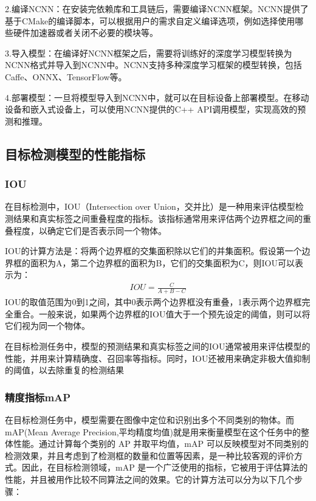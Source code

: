 \documentclass{ctexart}
\numberwithin{equation}{section}%
\numberwithin{figure}{section}%
\numberwithin{table}{section}%
\begin{document}
	2.编译NCNN：在安装完依赖库和工具链后，需要编译NCNN框架。NCNN提供了基于CMake的编译脚本，可以根据用户的需求自定义编译选项，例如选择使用哪些硬件加速器或者关闭不必要的模块等。
	
	3.导入模型：在编译好NCNN框架之后，需要将训练好的深度学习模型转换为NCNN格式并导入到NCNN中。NCNN支持多种深度学习框架的模型转换，包括Caffe、ONNX、TensorFlow等。
	
	4.部署模型：一旦将模型导入到NCNN中，就可以在目标设备上部署模型。在移动设备和嵌入式设备上，可以使用NCNN提供的C++ API调用模型，实现高效的预测和推理。
	
	\subsection{目标检测模型的性能指标}
	\subsubsection{IOU}
	在目标检测中，IOU（Intersection over Union，交并比）是一种用来评估模型检测结果和真实标签之间重叠程度的指标。该指标通常用来评估两个边界框之间的重叠程度，以确定它们是否表示同一个物体。
	
	IOU的计算方法是：将两个边界框的交集面积除以它们的并集面积。假设第一个边界框的面积为A，第二个边界框的面积为B，它们的交集面积为C，则IOU可以表示为：
		\begin{align}
			IOU = \frac{C}{A + B - C}
		\end{align}
	IOU的取值范围为0到1之间，其中0表示两个边界框没有重叠，1表示两个边界框完全重合。一般来说，如果两个边界框的IOU值大于一个预先设定的阈值，则可以将它们视为同一个物体。
	
	在目标检测任务中，模型的预测结果和真实标签之间的IOU通常被用来评估模型的性能，并用来计算精确度、召回率等指标。同时，IOU还被用来确定非极大值抑制的阈值，以去除重复的检测结果
	
	\subsubsection{精度指标mAP}
	在目标检测任务中，模型需要在图像中定位和识别出多个不同类别的物体。而mAP(Mean Average Precision,平均精度均值)就是用来衡量模型在这个任务中的整体性能。通过计算每个类别的 AP 并取平均值，mAP 可以反映模型对不同类别的检测效果，并且考虑到了检测框的数量和位置等因素，是一种比较客观的评价方式。因此，在目标检测领域，mAP 是一个广泛使用的指标，它被用于评估算法的性能，并且被用作比较不同算法之间的效果。它的计算方法可以分为以下几个步骤：
	
%	
%	
	
\end{document}
